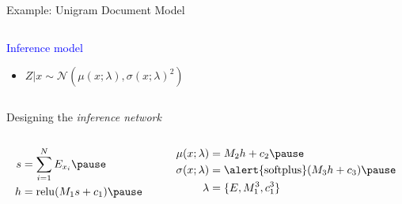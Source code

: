 \begin{frame}{Example: Unigram Document Model}


\begin{columns}
	\begin{column}{0.75\textwidth}  
   		\textcolor{blue}{Inference model}
		\begin{itemize}
			\item $Z|x \sim \mathcal N(\mu(x; \lambda), \sigma(x; \lambda)^2)$
		\end{itemize}
    \end{column}
	\begin{column}{0.2\textwidth}
    \end{column}    
    \end{columns}
    \pause
    
    Designing the \emph{inference network}\pause
    \vspace{-10pt}
    \begin{columns}
    \begin{column}{0.35\textwidth}
    \begin{equation*}
	\begin{aligned}		
		s &= \sum_{i=1}^N E_{x_i} \pause \\
		h &= \relu(M_1s+c_1)  \pause 		
	\end{aligned}
	\end{equation*}
	\end{column}
	\begin{column}{0.6\textwidth}
	\begin{equation*}
	\begin{aligned}		
		\mu(x; \lambda) &= M_2h + c_2  \pause \\
		\sigma(x; \lambda) &= \alert{\softplus}(M_3h + c_3)  \pause \\
		\lambda &= \{E, M_1^3, c_1^3\}
	\end{aligned}
	\end{equation*}
	\end{column}
	\end{columns}
	

\end{frame}


